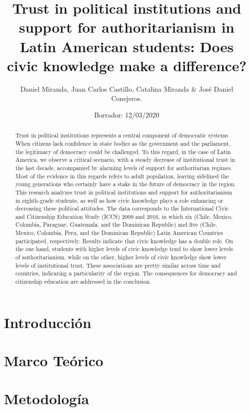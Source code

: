 \documentclass[11pt,]{article}
\title{\vspace{0.5cm} \Large{Trust in political institutions and support for authoritarianism in Latin American students: Does civic knowledge make a difference?}}
\author{Daniel Miranda, Juan Carlos Castillo, Catalina Miranda \& José Daniel
Conejeros.}
\date{Borrador: 12/03/2020}
\begin{document}
\maketitle
\begin{abstract}
Trust in political institutions represents a central component of
democratic systems. When citizens lack confidence in state bodies as the
government and the parliament, the legitimacy of democracy could be
challenged. To this regard, in the case of Latin America, we observe a
critical scenario, with a steady decrease of institutional trust in the
last decade, accompanied by alarming levels of support for authoritarian
regimes. Most of the evidence in this regards refers to adult
population, leaving sidelined the young generations who certainly have a
stake in the future of democracy in the region. This research analyzes
trust in political institutions and support for authoritarianism in
eighth-grade students, as well as how civic knowledge plays a role
enhancing or decreasing these political attitudes. The data corresponds
to the International Civic and Citizenship Education Study (ICCS) 2009
and 2016, in which six (Chile, Mexico, Colombia, Paraguay, Guatemala,
and the Dominican Republic) and five (Chile, Mexico, Colombia, Peru, and
the Dominican Republic) Latin American Countries participated,
respectively. Results indicate that civic knowledge has a double role.
On the one hand, students with higher levels of civic knowledge tend to
show lower levels of authoritarianism, while on the other, higher levels
of civic knowledge show lower levels of institutional trust. These
associations are pretty similar across time and countries, indicating a
particularity of the region. The consequences for democracy and
citizenship education are addressed in the conclusion.
\end{abstract}

\hypertarget{introduccion}{%
\section{Introducción}\label{introduccion}}

\break

\hypertarget{marco-teorico}{%
\section{Marco Teórico}\label{marco-teorico}}

\break

\hypertarget{metodologia}{%
\section{Metodología}\label{metodologia}}
\end{document}
